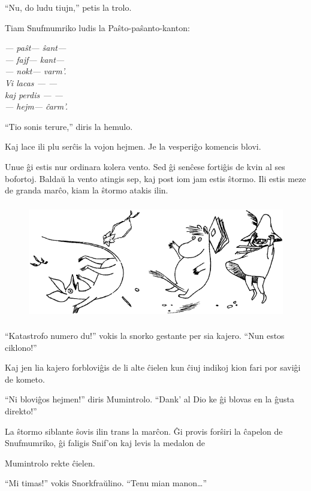 ``Nu, do ludu tiujn,'' petis la trolo.

Tiam Snufmumriko ludis la Paŝto-paŝanto-kanton:

\begin{center}\itshape --- paŝt--- ŝant---\\
--- fajf--- kant---\\
--- nokt--- varm'.\\
Vi lacas --- ---\\
kaj perdis --- ---\\
--- hejm--- ĉarm'.\\\end{center}

``Tio sonis terure,'' diris la hemulo.

Kaj lace ili plu serĉis la vojon hejmen. Je la vesperiĝo komencis blovi.

Unue ĝi estis nur ordinara kolera vento. Sed ĝi senĉese fortiĝis de kvin al ses bofortoj. Baldaŭ la vento atingis sep, kaj post iom jam estis ŝtormo. Ili estis meze de granda marĉo, kiam la ŝtormo atakis ilin.

\begin{figure}[htbp]
\centering
\includegraphics[width=350pt,height=143pt]{8-6.png}
\caption{}
\label{8-6}
\end{figure}

``Katastrofo numero du!'' vokis la snorko gestante per sia kajero. ``Nun estos ciklono!''

Kaj jen lia kajero forbloviĝis de li alte ĉielen kun ĉiuj indikoj kion fari por saviĝi de kometo.

``Ni bloviĝos hejmen!'' diris Mumintrolo. ``Dank' al Dio ke ĝi blovas en la ĝusta direkto!''

La ŝtormo siblante ŝovis ilin trans la marĉon. Ĝi provis forŝiri la ĉapelon de Snufmumriko, ĝi faligis Snif'on kaj levis la medalon de

Mumintrolo rekte ĉielen.

``Mi timas!'' vokis Snorkfraŭlino. ``Tenu mian manon{\ldots}''


